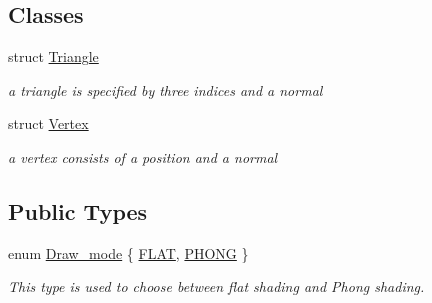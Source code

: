 \subsection*{Classes}
\begin{DoxyCompactItemize}
\item 
struct \hyperlink{structMesh_1_1Triangle}{Triangle}
\begin{DoxyCompactList}\small\item\em a triangle is specified by three indices and a normal \end{DoxyCompactList}\item 
struct \hyperlink{structMesh_1_1Vertex}{Vertex}
\begin{DoxyCompactList}\small\item\em a vertex consists of a position and a normal \end{DoxyCompactList}\end{DoxyCompactItemize}
\subsection*{Public Types}
\begin{DoxyCompactItemize}
\item 
enum \hyperlink{classMesh_aa4144c3cad2e62df26ad90131e59aa6a}{Draw\+\_\+mode} \{ \hyperlink{classMesh_aa4144c3cad2e62df26ad90131e59aa6aae58e62c20878ec327ed6409c7852b871}{F\+L\+AT}, 
\hyperlink{classMesh_aa4144c3cad2e62df26ad90131e59aa6aafc0cc7ddf5257c8d2a52d84573da372a}{P\+H\+O\+NG}
 \}\begin{DoxyCompactList}\small\item\em This type is used to choose between flat shading and Phong shading. \end{DoxyCompactList}
\end{DoxyCompactItemize}
